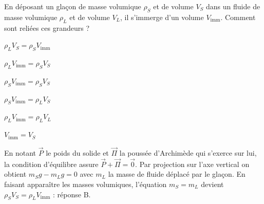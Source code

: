 \debutEntrainement


\begin{enonce}
En déposant un glaçon de masse volumique $\rho_S$ et de volume $V_S$ dans un fluide de masse volumique $\rho_L$ et de volume $V_L$, il s'immerge d'un volume $V_\mathrm{imm}$. Comment sont reliées ces grandeurs ?
	
	\begin{listeQCM2Colonnes}
	\item $\rho_L V_S=\rho_S V_\mathrm{imm}$
	\item $\rho_L V_\mathrm{imm}=\rho_S V_S$
	\item $\rho_S V_\mathrm{imm}=\rho_S V_S$
	\item $\rho_S V_\mathrm{imm}=\rho_L V_S$
	\item $\rho_L V_\mathrm{imm}=\rho_L V_L$
	\item $V_\mathrm{imm}=V_S$
	\end{listeQCM2Colonnes}

\end{enonce}

\reponse{\reponseB{}}

\begin{corrige}
	En notant $\overrightarrow{P}$ le poids du solide et $\overrightarrow{\Pi}$ la poussée d'Archimède qui s'exerce sur lui, la condition d'équilibre assure $\overrightarrow{P}+\overrightarrow{\Pi}=\overrightarrow{0}$. Par projection sur l'axe vertical on obtient $m_S g - m_L g=0$ avec $m_L$ la masse de fluide déplacé par le glaçon. En faisant apparaître les masses volumiques, l'équation $m_S = m_L$ devient $\rho_S V_S = \rho_L V_\mathrm{imm}$ : réponse B.
\end{corrige}


\finEntrainement


